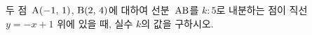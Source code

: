 두 점~$\mathrm{A}(-1,\,1)$, $\mathrm{B}(2,\,4)$에 대하여 선분~$\mathrm{AB}$를 $k:5$로 내분하는 점이 직선~$y=-x+1$ 위에 있을 때, 실수 $k$의 값을 구하시오.
